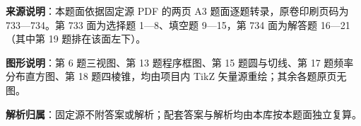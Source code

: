 

\begin{gknotice}
\textbf{来源说明}：本题面依据固定源 PDF 的两页 A3 题面逐题转录，原卷印刷页码为 733—734。第 733 面为选择题 1—8、填空题 9—15，第 734 面为解答题 16—21（其中第 19 题排在该面左下）。

\textbf{图形说明}：第 6 题三视图、第 13 题程序框图、第 15 题圆与切线、第 17 题频率分布直方图、第 18 题四棱锥，均由项目内 TikZ 矢量源重绘；其余各题原页无图。

\textbf{解析归属}：固定源不附答案或解析；配套答案与解析均由本库按本题面独立复算。
\end{gknotice}


